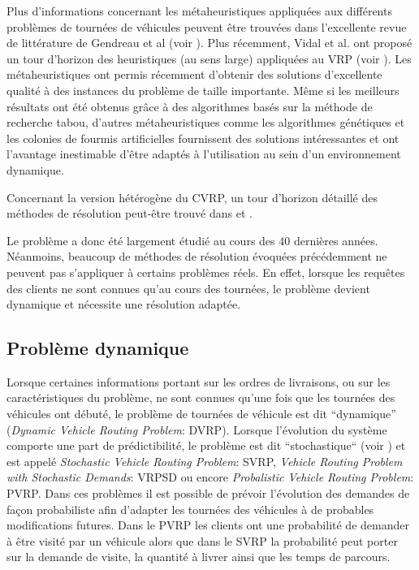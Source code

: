 Plus d'informations concernant les métaheuristiques appliquées aux différents problèmes de tournées de véhicules peuvent être trouvées dans l'excellente revue de littérature de Gendreau et al (voir \cite{Gendreau2008}). Plus récemment, Vidal et al. ont proposé un tour d'horizon des heuristiques (au sens large) appliquées au VRP (voir \cite{Vidal2011}).
Les métaheuristiques ont permis récemment d'obtenir des solutions d'excellente qualité à des instances du problème de taille importante. Même si les meilleurs résultats ont été obtenus grâce à des algorithmes basés sur la méthode de recherche tabou, d'autres métaheuristiques comme les algorithmes génétiques et les colonies de fourmis artificielles fournissent des solutions intéressantes et ont l'avantage inestimable d'être adaptés à l'utilisation au sein d'un environnement dynamique.

Concernant la version hétérogène du CVRP, un tour d'horizon détaillé des méthodes de résolution peut-être trouvé dans \cite{Baldacci2008} et \cite{Berbeglia2007}. 

Le problème a donc été largement étudié au cours des 40 dernières années. Néanmoins, beaucoup de méthodes de résolution évoquées précédemment ne peuvent pas s'appliquer à certains problèmes réels. En effet, lorsque les requêtes des clients ne sont connues qu'au cours des tournées, le problème devient dynamique et nécessite une résolution adaptée.

\subsection{Problème dynamique}
Lorsque certaines informations portant sur les ordres de livraisons, ou sur les caractéristiques du problème, ne sont connues qu'une fois que les tournées des véhicules ont débuté, le problème de tournées de véhicule est dit ``dynamique'' (\textit{Dynamic Vehicle Routing Problem}: DVRP). Lorsque l'évolution du système comporte une part de prédictibilité, le problème est dit ``stochastique`` (voir \cite{Gendreau1996}) et est appelé \textit{Stochastic Vehicle Routing Problem}: SVRP, \textit{Vehicle Routing Problem with Stochastic Demands}: VRPSD ou encore \textit{Probalistic Vehicle Routing Problem}: PVRP. Dans ces problèmes il est possible de prévoir l'évolution des demandes de façon probabiliste afin d'adapter les tournées des véhicules à de probables modifications futures. Dans le PVRP les clients ont une probabilité de demander à être visité par un véhicule alors que dans le SVRP la probabilité peut porter sur la demande de visite, la quantité à livrer ainsi que les temps de parcours.

